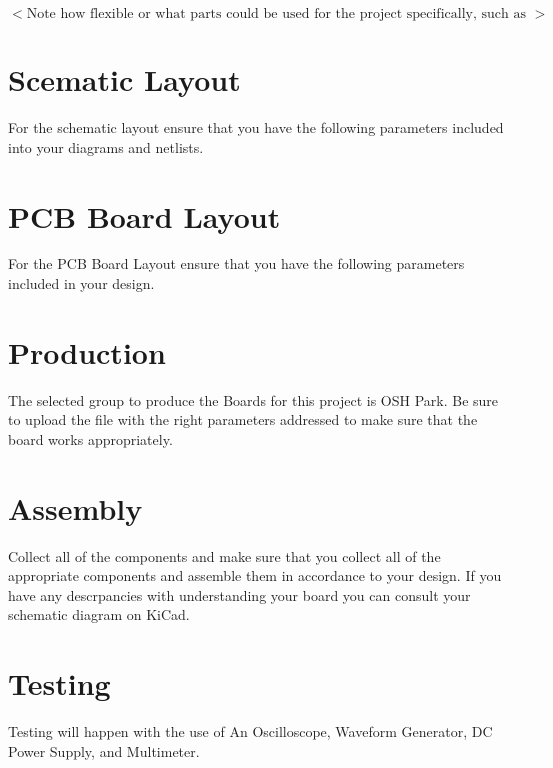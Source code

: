\documentclass[12pt, letterpaper]{article}
\begin{document}
$<\text{Note how flexible or what parts could be used for the project specifically, such as operational amplifiers.}>$

\section{Scematic Layout}
For the schematic layout ensure that you have the following parameters included into your diagrams and netlists.

\section{PCB Board Layout}
For the PCB Board Layout ensure that you have the following parameters included in your design.

\section{Production}
The selected group to produce the Boards for this project is OSH Park. Be sure to upload the file with the right parameters addressed to make sure that the board works appropriately.

\section{Assembly}
Collect all of the components and make sure that you collect all of the appropriate components and assemble them in accordance to your design. If you have any descrpancies with understanding your board you can consult your schematic diagram on KiCad.

\section{Testing}
Testing will happen with the use of An Oscilloscope, Waveform Generator, DC Power Supply, and Multimeter.
\end{document}
